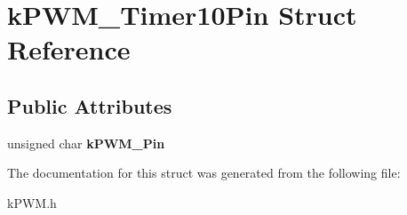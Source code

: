 \hypertarget{structkPWM__Timer10Pin}{}\section{k\+P\+W\+M\+\_\+\+Timer10\+Pin Struct Reference}
\label{structkPWM__Timer10Pin}
\subsection*{Public Attributes}
\begin{DoxyCompactItemize}
\item 
unsigned char {\bfseries k\+P\+W\+M\+\_\+\+Pin}\hypertarget{structkPWM__Timer10Pin_a92dfb75ce6732f6b3bce71d46d5009eb}{}\label{structkPWM__Timer10Pin_a92dfb75ce6732f6b3bce71d46d5009eb}

\end{DoxyCompactItemize}


The documentation for this struct was generated from the following file\+:\begin{DoxyCompactItemize}
\item 
k\+P\+W\+M.\+h\end{DoxyCompactItemize}
